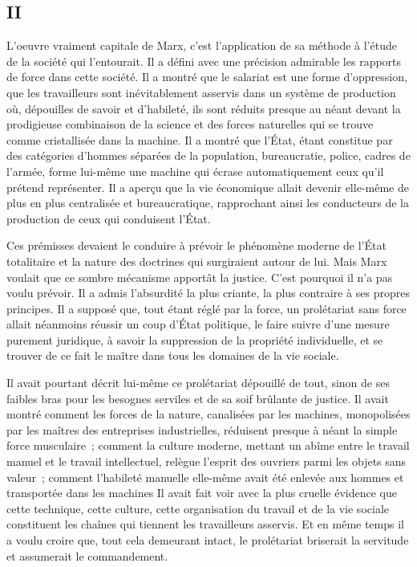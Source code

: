 \documentclass[french,twoside]{book} %
\begin{document}
\subsection[II]{II}
\noindent L'oeuvre vraiment capitale de Marx, c'est l'application de sa méthode à l'étude de la société qui l'entourait. Il a défini avec une précision admirable les rapports de force dans cette société. Il a montré que le salariat est une forme d'oppression, que les travailleurs sont inévitablement asservis dans un système de production où, dépouilles de savoir et d'habileté, ils sont réduits presque au néant devant la prodigieuse combinaison de la science et des forces naturelles qui se trouve comme cristallisée dans la machine. Il a montré que l'État, étant constitue par des catégories d'hommes séparées de la population, bureaucratie, police, cadres de l'armée, forme lui-même une machine qui écrase automatiquement ceux qu'il prétend représenter. Il a aperçu que la vie économique allait devenir elle-même de plus en plus centralisée et bureaucratique, rapprochant ainsi les conducteurs de la production de ceux qui conduisent l'État.\par
Ces prémisses devaient le conduire à prévoir le phénomène moderne de l'État totalitaire et la nature des doctrines qui surgiraient autour de lui. Mais Marx voulait que ce sombre mécanisme apportât la justice. C'est pourquoi il n'a pas voulu prévoir. Il a admis l'absurdité la plus criante, la plus contraire à ses propres principes. Il a supposé que, tout étant réglé par la force, un prolétariat sans force allait néanmoins réussir un coup d'État politique, le faire suivre d'une mesure purement juridique, à savoir la suppression de la propriété individuelle, et se trouver de ce fait le maître dans tous les domaines de la vie sociale.\par
Il avait pourtant décrit lui-même ce prolétariat dépouillé de tout, sinon de ses faibles bras pour les besognes serviles et de sa soif brûlante de justice. Il avait montré comment les forces de la nature, canalisées par les machines, monopolisées par les maîtres des entreprises industrielles, réduisent presque à néant la simple force musculaire ; comment la culture moderne, mettant un abîme entre le travail manuel et le travail intellectuel, relègue l'esprit des ouvriers parmi les objets sans valeur ; comment l'habileté manuelle elle-même avait été enlevée aux hommes et transportée dans les machines Il avait fait voir avec la plus cruelle évidence que cette technique, cette culture, cette organisation du travail et de la vie sociale constituent les chaînes qui tiennent les travailleurs asservis. Et en même temps il a voulu croire que, tout cela demeurant intact, le prolétariat briserait la servitude et assumerait le commandement.\par
\end{document}
